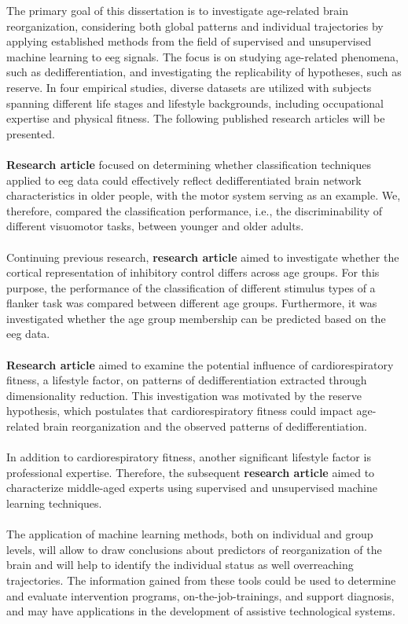 The primary goal of this dissertation is to investigate age-related brain reorganization, considering both global patterns and individual trajectories by applying established methods from the field of supervised and unsupervised machine learning to \gls{eeg} signals. The focus is on studying age-related phenomena, such as dedifferentiation, and investigating the replicability of hypotheses, such as reserve. In four empirical studies, diverse datasets are utilized with subjects spanning different life stages and lifestyle backgrounds, including occupational expertise and physical fitness. The following published research articles will be presented.\\
\\
\textbf{Research article } focused on determining whether classification techniques applied to \gls{eeg} data could effectively reflect dedifferentiated brain network characteristics in older people, with the motor system serving as an example. We, therefore, compared the classification performance, i.e., the discriminability of different visuomotor tasks, between younger and older adults.\\
\\
Continuing previous research, \textbf{research article } aimed to investigate whether the cortical representation of inhibitory control differs across age groups. For this purpose, the performance of the classification of different stimulus types of a flanker task was compared between different age groups. Furthermore, it was investigated whether the age group membership can be predicted based on the \gls{eeg} data.\\
\\
\textbf{Research article } aimed to examine the potential influence of cardiorespiratory fitness, a lifestyle factor, on patterns of dedifferentiation extracted through dimensionality reduction. This investigation was motivated by the reserve hypothesis, which postulates that cardiorespiratory fitness could impact age-related brain reorganization and the observed patterns of dedifferentiation.\\
\\
In addition to cardiorespiratory fitness, another significant lifestyle factor is professional expertise. Therefore, the subsequent \textbf{research article } aimed to characterize middle-aged experts using supervised and unsupervised machine learning techniques.\\
\\
The application of machine learning methods, both on individual and group levels, will allow to draw conclusions about predictors of reorganization of the brain and will help to identify the individual status as well overreaching trajectories. The information gained from these tools could be used to determine and evaluate intervention programs, on-the-job-trainings, and support diagnosis, and may have applications in the development of assistive technological systems. 